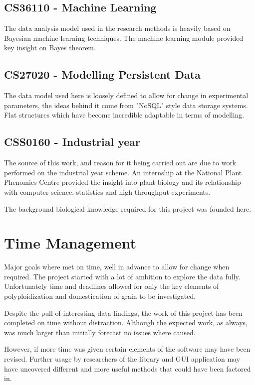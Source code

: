 \documentclass[11pt]{report}
\begin{document}
\subsection{CS36110 - Machine Learning}
\label{sec:org6b8bcdb}
The data analysis model used in the research methods is heavily based on Bayesian machine learning techniques. The machine learning module provided key insight on Bayes theorem.
\subsection{CS27020 - Modelling Persistent Data}
\label{sec:org002c4e8}
The data model used here is loosely defined to allow for change in experimental parameters, the ideas behind it come from "NoSQL" style data storage systems. Flat structures which have become incredible adaptable in terms of modelling.
\subsection{CSS0160 - Industrial year}
\label{sec:org1726202}
The source of this work, and reason for it being carried out are due to work performed on the industrial year scheme. An internship at the National Plant Phenomics Centre provided the insight into plant biology and its relationship with computer science, statistics and high-throughput experiments.

The background biological knowledge required for this project was founded here.

\section{Time Management}
\label{sec:org5d42112}
Major goals where met on time, well in advance to allow for change when required. The project started with a lot of ambition to explore the data fully. Unfortunately time and deadlines allowed for only the key elements of polyploidization and domestication of grain to be investigated.

Despite the pull of interesting data findings, the work of this project has been completed on time without distraction. Although the expected work, as always, was much larger than initially forecast no issues where caused.

However, if more time was given certain elements of the software may have been revised. Further usage by researchers of the library and GUI application may have uncovered  different and more useful methods that could have been factored in.
\end{document}
